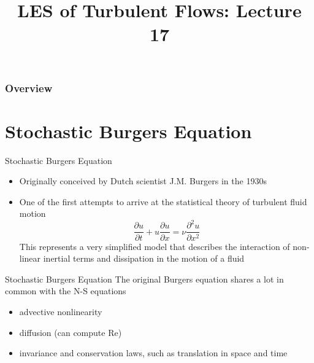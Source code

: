  
\title{LES of Turbulent Flows: Lecture 17}



\begin{frame} 
  \titlepage
\end{frame}


\begin{frame}
\frametitle{Overview}
\tableofcontents
\end{frame}

\section{Stochastic Burgers Equation} %
\begin{frame}{Stochastic Burgers Equation}
\begin{itemize}
	\item Originally conceived by Dutch scientist J.M. Burgers in the 1930s
	\item One of the first attempts to arrive at the statistical theory of turbulent fluid motion
	$$\frac{\partial u}{\partial t} + u\frac{\partial u}{\partial x} = \nu \frac{\partial^2 u}{\partial x^2}$$
	This represents a very simplified model that describes the interaction of non-linear inertial terms and dissipation in the motion of a fluid
\end{itemize}
\end{frame}
\begin{frame}{Stochastic Burgers Equation}
The original Burgers equation shares a lot in common with the N-S equations
\begin{itemize}
	\item advective nonlinearity
	\item diffusion (can compute Re)
	\item invariance and conservation laws, such as translation in space and time
\end{itemize}
\end{frame}

